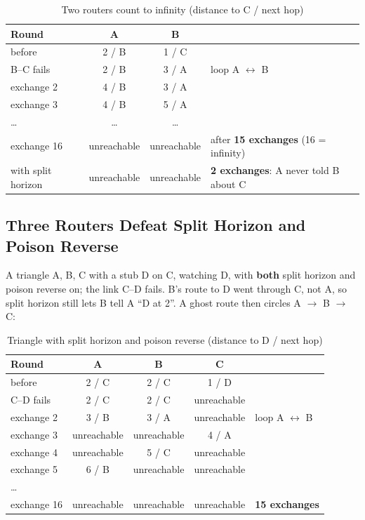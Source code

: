 \documentclass[11pt,a4paper]{article}
\begin{document}
\begin{table}[H]
\centering
\caption{Two routers count to infinity (distance to C / next hop)}
\small
\begin{tabular}{@{}lccl@{}}
\toprule
\textbf{Round} & \textbf{A} & \textbf{B} & \\ \midrule
before & 2 / B & 1 / C & \\
B--C fails & 2 / B & 3 / A & loop A $\leftrightarrow$ B \\
exchange 2 & 4 / B & 3 / A & \\
exchange 3 & 4 / B & 5 / A & \\
\ldots & \ldots & \ldots & \\
exchange 16 & unreachable & unreachable & after \textbf{15 exchanges} (16 = infinity) \\ \midrule
with split horizon & unreachable & unreachable & \textbf{2 exchanges}: A never told B about C \\ \bottomrule
\end{tabular}
\end{table}

\subsection{Three Routers Defeat Split Horizon and Poison Reverse}
A triangle A, B, C with a stub D on C, watching D, with \textbf{both} split horizon and poison reverse on; the link C--D fails. B's route to D went through C, not A, so split horizon still lets B tell A ``D at 2''. A ghost route then circles A $\rightarrow$ B $\rightarrow$ C:

\begin{table}[H]
\centering
\caption{Triangle with split horizon and poison reverse (distance to D / next hop)}
\small
\begin{tabular}{@{}lcccl@{}}
\toprule
\textbf{Round} & \textbf{A} & \textbf{B} & \textbf{C} & \\ \midrule
before & 2 / C & 2 / C & 1 / D & \\
C--D fails & 2 / C & 2 / C & unreachable & \\
exchange 2 & 3 / B & 3 / A & unreachable & loop A $\leftrightarrow$ B \\
exchange 3 & unreachable & unreachable & 4 / A & \\
exchange 4 & unreachable & 5 / C & unreachable & \\
exchange 5 & 6 / B & unreachable & unreachable & \\
\ldots & & & & \\
exchange 16 & unreachable & unreachable & unreachable & \textbf{15 exchanges} \\ \bottomrule
\end{tabular}
\end{table}
\end{document}
